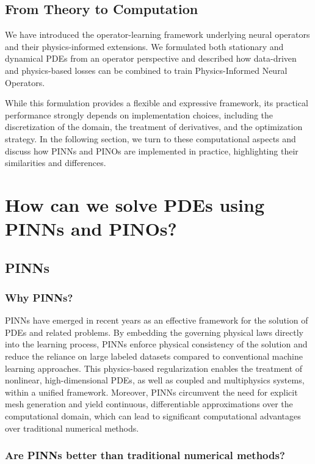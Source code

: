 \documentclass[final,1p,times]{elsarticle}
\theoremstyle{definition}
\begin{document}
\subsection{From Theory to Computation}

We have introduced the operator-learning framework underlying neural operators and their physics-informed extensions. We formulated both stationary and dynamical PDEs from an operator perspective and described how data-driven and physics-based losses can be combined to train Physics-Informed Neural Operators.

While this formulation provides a flexible and expressive framework, its practical performance strongly depends on implementation choices, including the discretization of the domain, the treatment of derivatives, and the optimization strategy. In the following section, we turn to these computational aspects and discuss how PINNs and PINOs are implemented in practice, highlighting their similarities and differences.

\section{How can we solve PDEs using PINNs and PINOs?}

\subsection{PINNs}

\subsubsection{Why PINNs?}

PINNs have emerged in recent years as an effective framework for the solution of PDEs and related problems. By embedding the governing physical laws directly into the learning process, PINNs enforce physical consistency of the solution and reduce the reliance on large labeled datasets compared to conventional machine learning approaches. This physics-based regularization enables the treatment of nonlinear, high-dimensional PDEs, as well as coupled and multiphysics systems, within a unified framework. Moreover, PINNs circumvent the need for explicit mesh generation and yield continuous, differentiable approximations over the computational domain, which can lead to significant computational advantages over traditional numerical methods.

\subsubsection{Are PINNs better than traditional numerical methods?}
\end{document}
